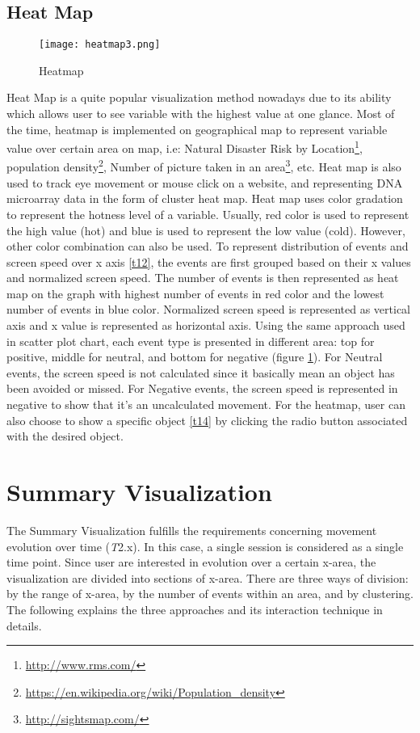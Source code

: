 \subsection{Heat Map}
\begin{figure}
\centering
\texttt{[image: heatmap3.png]}
\caption{Heatmap}
\label{heatmap}
\end{figure}
Heat Map is a quite popular visualization method nowadays due to its ability which allows user to see variable with the highest value at one glance. Most of the time, heatmap is implemented on geographical map to represent variable value over certain area on map, i.e: Natural Disaster Risk by Location\footnote{\url{http://www.rms.com/}}, population density\footnote{\url{https://en.wikipedia.org/wiki/Population_density}}, Number of picture taken in an area\footnote{\url{http://sightsmap.com/}}, etc. Heat map is also used to track eye movement or mouse click on a website, and representing DNA microarray data in the form of cluster heat map\cite{friendly}. Heat map uses color gradation to represent the hotness level of a variable. Usually, red color is used to represent the high value (hot) and blue is used to represent the low value (cold). However, other color combination can also be used. To represent distribution of events and screen speed over x axis \ref{t12}, the events are first grouped based on their x values and normalized screen speed. The number of events is then represented as heat map on the graph with highest number of events in red color and the lowest number of events in blue color. Normalized screen speed is represented as vertical axis and x value is represented as horizontal axis. Using the same approach used in scatter plot chart, each event type is presented in different area: top for positive, middle for neutral, and bottom for negative (figure \ref{heatmap}). For Neutral events, the screen speed is not calculated since it basically mean an object has been avoided or missed. For Negative events, the screen speed is represented in negative to show that it's an uncalculated movement. For the heatmap, user can also choose to show a specific object \ref{t14} by clicking the radio button associated with the desired object.

\section{Summary Visualization}
The Summary Visualization fulfills the requirements concerning movement evolution over time (\textit{T}2.x). In this case, a single session is considered as a single time point. Since user are interested in evolution over a certain x-area, the visualization are divided into sections of x-area. There are three ways of division: by the range of x-area, by the number of events within an area, and by clustering. The following explains the three approaches and its interaction technique in details.

